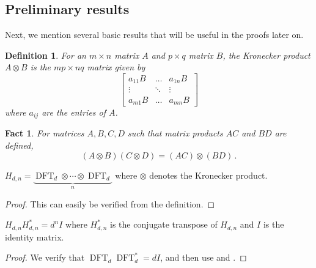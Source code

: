 \documentclass{toc}
\newtheorem{define}[theorem]{Definition}
\newtheorem{fact.}[theorem]{Fact}
\DeclareMathOperator{\DFT}{DFT}
\begin{document}
%
\subsection{Preliminary results}    %
Next, we mention several basic results that will be useful in the proofs later on.
\begin{define}
For an $m \times n$ matrix $A$ and $p \times q$ matrix $B$, the Kronecker product $A \otimes B$ is the $mp \times nq$ matrix given by
\[
\begin{bmatrix}
a_{11}B & \dots & a_{1n}B \\
\vdots & \ddots & \vdots \\
a_{m1}B & \dots & a_{mn}B
\end{bmatrix}
\]
where $a_{ij}$ are the entries of $A$.

\end{define}

%
\begin{fact.}    \label{product-kronecker}
For matrices $A,B,C,D$ such that matrix products $AC$ and $BD$ are defined,
\[
(A \otimes B)(C \otimes D) = (AC) \otimes (BD) \,.
\]
\end{fact.}
%

\begin{claim}
%
$H_{d,n} = \underbrace{\DFT_d \otimes \cdots \otimes \DFT_d}_{\text{$n$}}$
%
where $\otimes$ denotes the Kronecker product.
\end{claim}
\begin{proof}
This can easily be verified from the definition.
\end{proof}
%
%
\begin{claim}\label{orthogonal}
$H_{d,n}H_{d,n}^* = d^nI$ where $H_{d,n}^*$ is the conjugate transpose of $H_{d,n}$ and $I$ is the identity matrix.
\end{claim}
\begin{proof}
We verify that %
$\DFT_d\DFT_d^* = dI$, %
and then
%
%
use  and
.     %
\end{proof}

%
%
%

%
\end{document}
